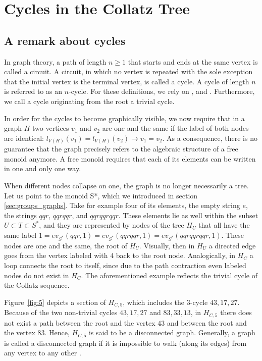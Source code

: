 \chapter{Cycles in the Collatz Tree}

\section{A remark about cycles}
\label{sec:cycles}
In graph theory, a path of length $n\geq 1$ that starts and ends at the same vertex is called a circuit. A circuit, in which no vertex is repeated with the sole exception that the initial vertex is the terminal vertex, is called a cycle. A cycle of length $n$ is referred to as an $n$-cycle. For these definitions, we rely on \cite[p.~599]{Ref_Rosen}, \cite[p.~35]{Ref_Benjamin_Chartrand_Zhang} and \cite[p.~445]{Ref_Chartrand_Zhang}. Furthermore, we call a cycle originating from the root a trivial cycle.

\begin{remark}
	In order for the cycles to become graphically visible, we now require that in a graph $H$ two vertices $v_1$ and $v_2$ are one and the same if the label of both nodes are identical: $l_{V(H)}(v_1)=l_{V(H)}(v_2)\rightarrow v_1=v_2$. As a consequence, there is no guarantee that the graph precisely refers to the algebraic structure of a free monoid anymore. A free monoid requires that each of its elements can be written in one and only one way.
\end{remark}

When different nodes collapse on one, the graph is no longer necessarily a tree. Let us point to the monoid S*, which we introduced in section \ref{sec:groups_graphs}. Take for example four of its elements, the empty string $e$, the strings $qqr$, $qqrqqr$, and $qqrqqrqqr$. These elements lie as well within the subset $U\subset T\subset S^*$, and they are represented by nodes of the tree $H_U$ that all have the same label $1=ev_{S^*}(qqr,1)=ev_{S^*}(qqrqqr,1)=ev_{S^*}(qqrqqrqqr,1)$. These nodes are one and the same, the root of $H_U$. Visually, then in $H_U$ a directed edge goes from the vertex labeled with $4$ back to the root node. Analogically, in $H_C$ a loop connects the root to itself, since due to the path contraction even labeled nodes do not exist in $H_C$. The  aforementioned example reflects the trivial cycle of the Collatz sequence.

\par\medskip
Figure~\ref{fig:5} depicts a section of $H_{C,5}$, which includes the $3$-cycle $43,17,27$. Because of the two non-trivial cycles $43,17,27$ and $83,33,13$, in $H_{C,5}$ there does not exist a path between the root and the vertex $43$ and between the root and the vertex $83$. Hence, $H_{C,5}$ is said to be a disconnected graph. Generally, a graph is called a disconnected graph if it is impossible to walk (along its edges) from any vertex to any other \cite[pp.~46-47]{Ref_Benjamin_Chartrand_Zhang}.

